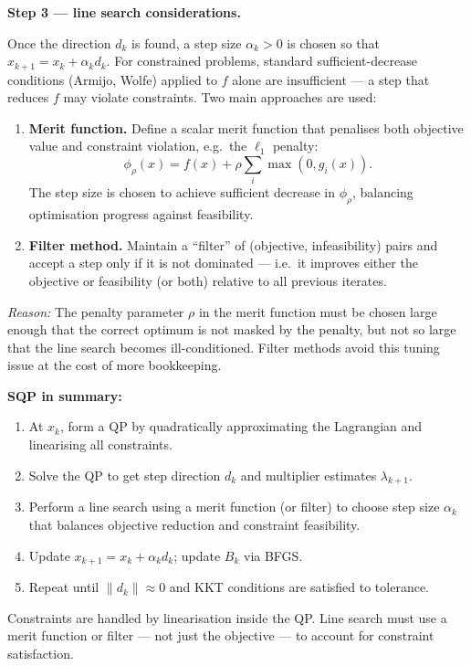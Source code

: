 \documentclass[10pt,a4paper]{article}
\newcommand{\reason}[1]{%
  \begin{mdframed}[backgroundcolor=reasonbg, linewidth=0.4pt,
    innertopmargin=3pt, innerbottommargin=3pt,
    innerleftmargin=6pt, innerrightmargin=6pt]
    \small\textit{Reason:} \small #1
  \end{mdframed}\vspace{2pt}}
\newenvironment{resultbox}{%
  \begin{mdframed}[backgroundcolor=boxbg, linewidth=0.6pt,
    innertopmargin=5pt, innerbottommargin=5pt,
    innerleftmargin=8pt, innerrightmargin=8pt]
}{\end{mdframed}}
\begin{document}
\textbf{Step 3 --- line search considerations.}

Once the direction $d_k$ is found, a step size $\alpha_k > 0$ is chosen
so that $x_{k+1} = x_k + \alpha_k d_k$. For constrained problems,
standard sufficient-decrease conditions (Armijo, Wolfe) applied to $f$
alone are insufficient --- a step that reduces $f$ may violate
constraints. Two main approaches are used:

\begin{enumerate}[noitemsep]
  \item \textbf{Merit function.} Define a scalar merit function that
        penalises both objective value and constraint violation, e.g.\
        the $\ell_1$ penalty:
        \[
          \phi_\rho(x) = f(x) + \rho\sum_i \max(0, g_i(x)).
        \]
        The step size is chosen to achieve sufficient decrease in
        $\phi_\rho$, balancing optimisation progress against feasibility.
  \item \textbf{Filter method.} Maintain a ``filter'' of
        (objective, infeasibility) pairs and accept a step only if it
        is not dominated --- i.e.\ it improves either the objective
        or feasibility (or both) relative to all previous iterates.
\end{enumerate}

\reason{The penalty parameter $\rho$ in the merit function must be
        chosen large enough that the correct optimum is not masked by
        the penalty, but not so large that the line search becomes
        ill-conditioned. Filter methods avoid this tuning issue at the
        cost of more bookkeeping.}

\begin{resultbox}
\textbf{SQP in summary:}
\begin{enumerate}[noitemsep]
  \item At $x_k$, form a QP by quadratically approximating the
        Lagrangian and linearising all constraints.
  \item Solve the QP to get step direction $d_k$ and multiplier
        estimates $\lambda_{k+1}$.
  \item Perform a line search using a merit function (or filter) to
        choose step size $\alpha_k$ that balances objective reduction
        and constraint feasibility.
  \item Update $x_{k+1} = x_k + \alpha_k d_k$; update $B_k$ via BFGS.
  \item Repeat until $\|d_k\| \approx 0$ and KKT conditions are
        satisfied to tolerance.
\end{enumerate}
Constraints are handled by linearisation inside the QP. Line search
must use a merit function or filter --- not just the objective --- to
account for constraint satisfaction.
\end{resultbox}
\end{document}

